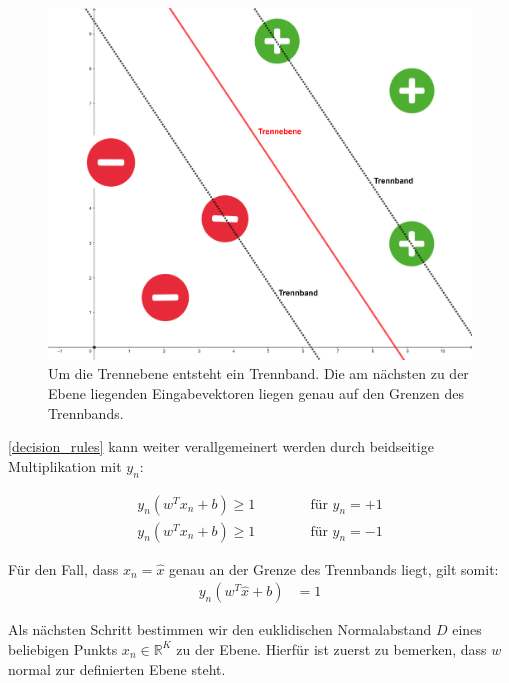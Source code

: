 \documentclass[a4paper,11pt,twoside]{scrreprt}
\begin{document}
\begin{figure}[H]
	\centering
	\includegraphics[width = 12cm]{assets/trennband.png}
	\caption{Um die Trennebene entsteht ein Trennband. Die am nächsten zu der Ebene liegenden Eingabevektoren liegen genau auf den Grenzen des Trennbands.}
	\label{fig:trennband}
\end{figure}



 \autoref{decision_rules} kann weiter verallgemeinert werden durch beidseitige Multiplikation mit $y_{n}$:

\begin{subequations} \label{decision_rules2}
	\begin{alignat}{2}
		y_{n} (w^{T} x_{n} + b) \geq 1 & \qquad & \text{ für } y_{n} = +1\\
		y_{n} (w^{T} x_{n} + b) \geq 1 & & \text{ für } y_{n} = -1
	\end{alignat}
\end{subequations}



Für den Fall, dass $x_{n} = \hat{x}$ genau an der Grenze des Trennbands liegt, gilt somit:
\begin{equation} \label{dec_rule}
	\begin{aligned}
		y_{n} (w^{T} \hat{x} + b) &= 1
	\end{aligned}
\end{equation}


Als nächsten Schritt bestimmen wir den euklidischen Normalabstand $D$ eines beliebigen Punkts $x_{n} \in \mathbb{R}^{K}$ zu der Ebene. Hierfür ist zuerst zu bemerken, dass $w$ normal zur definierten Ebene steht.
\end{document}
